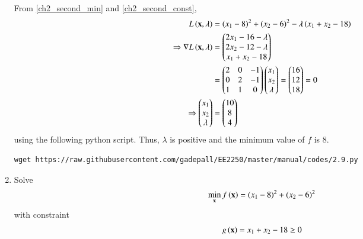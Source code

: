 \documentclass[journal,12pt,twocolumn]{IEEEtran}
\renewcommand\thesection{\arabic{section}}
\begin{document}
\begin{enumerate}[label=\thesection.\arabic*,ref=\thesection.\theenumi]
%
\solution
From \eqref{ch2_second_min} and \eqref{ch2_second_const}, 
%
\begin{align}
L\left(\mathbf{x},\lambda\right) &= (x_1-8)^2 + (x_2-6)^2 - \lambda \left(x_1 + x_2 - 18\right) \\
\Rightarrow \nabla L\left(\mathbf{x},\lambda\right)  & = 
\begin{pmatrix}
2x_1  - 16 - \lambda \\
2x_2 - 12 - \lambda \\
x_1 + x_2 -18
\end{pmatrix}
\\
&=
\begin{pmatrix}
2 &0 & - 1 \\
0 &2 & - 1 \\
1 & 1 & 0 
\end{pmatrix}
\begin{pmatrix}
x_1 \\
x_2 \\
\lambda
\end{pmatrix}
= 
\begin{pmatrix}
16 \\
 12 \\
18
\end{pmatrix}
=
0 
\\
\Rightarrow 
\begin{pmatrix}
x_1 \\
x_2 \\
\lambda
\end{pmatrix}
&= 
\begin{pmatrix}
10 \\
 8 \\
4
\end{pmatrix}
\end{align}
%
using the following python script.  Thus, $\lambda$ is positive and the minimum value of $f$ is 8.
%	
\begin{lstlisting}
wget https://raw.githubusercontent.com/gadepall/EE2250/master/manual/codes/2.9.py
\end{lstlisting}

%
%
\item
\label{ch2_prob_upper_cond}
Solve
	 \begin{align}
	\min_{\mathbf{x}} f\left(\mathbf{x}\right) = (x_1-8)^2 + (x_2-6)^2
	 \end{align}
	 with constraint
	 \begin{align}
	 g\left(\mathbf{x}\right) = x_1 + x_2 - 18 \geq 0 
	 \end{align}
	 

\end{enumerate}
\end{document}
